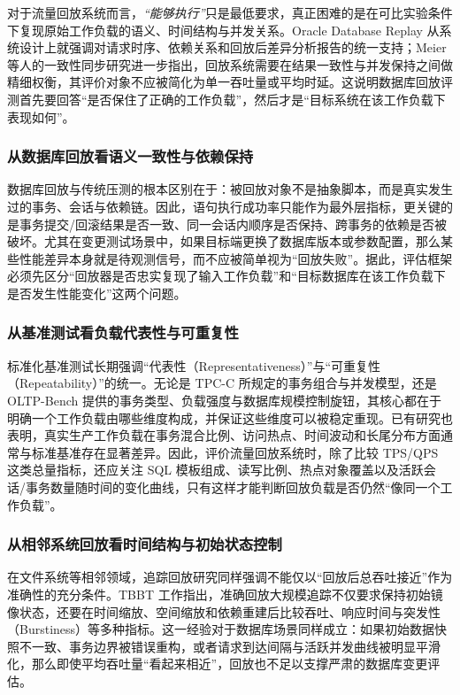 对于流量回放系统而言，\emph{“能够执行”}只是最低要求，真正困难的是在可比实验条件下复现原始工作负载的语义、时间结构与并发关系。Oracle Database Replay 从系统设计上就强调对请求时序、依赖关系和回放后差异分析报告的统一支持\cite{OracleDatabaseReplay,OracleReplayVLDB}；Meier 等人的一致性同步研究进一步指出，回放系统需要在结果一致性与并发保持之间做精细权衡，其评价对象不应被简化为单一吞吐量或平均时延\cite{ConsistentSync}。这说明数据库回放评测首先要回答“是否保住了正确的工作负载”，然后才是“目标系统在该工作负载下表现如何”。

\subsubsection{从数据库回放看语义一致性与依赖保持}

数据库回放与传统压测的根本区别在于：被回放对象不是抽象脚本，而是真实发生过的事务、会话与依赖链。因此，语句执行成功率只能作为最外层指标，更关键的是事务提交/回滚结果是否一致、同一会话内顺序是否保持、跨事务的依赖是否被破坏。尤其在变更测试场景中，如果目标端更换了数据库版本或参数配置，那么某些性能差异本身就是待观测信号，而不应被简单视为“回放失败”。据此，评估框架必须先区分“回放器是否忠实复现了输入工作负载”和“目标数据库在该工作负载下是否发生性能变化”这两个问题。

\subsubsection{从基准测试看负载代表性与可重复性}

标准化基准测试长期强调“代表性（Representativeness）”与“可重复性（Repeatability）”的统一。无论是 TPC-C 所规定的事务组合与并发模型，还是 OLTP-Bench 提供的事务类型、负载强度与数据库规模控制旋钮\cite{TPC-C,OLTPBench}，其核心都在于明确一个工作负载由哪些维度构成，并保证这些维度可以被稳定重现。已有研究也表明，真实生产工作负载在事务混合比例、访问热点、时间波动和长尾分布方面通常与标准基准存在显著差异\cite{ProductionWorkload}。因此，评价流量回放系统时，除了比较 TPS/QPS 这类总量指标，还应关注 SQL 模板组成、读写比例、热点对象覆盖以及活跃会话/事务数量随时间的变化曲线，只有这样才能判断回放负载是否仍然“像同一个工作负载”。

\subsubsection{从相邻系统回放看时间结构与初始状态控制}

在文件系统等相邻领域，追踪回放研究同样强调不能仅以“回放后总吞吐接近”作为准确性的充分条件。TBBT 工作指出，准确回放大规模追踪不仅要求保持初始镜像状态，还要在时间缩放、空间缩放和依赖重建后比较吞吐、响应时间与突发性（Burstiness）等多种指标\cite{TBBT}。这一经验对于数据库场景同样成立：如果初始数据快照不一致、事务边界被错误重构，或者请求到达间隔与活跃并发曲线被明显平滑化，那么即使平均吞吐量“看起来相近”，回放也不足以支撑严肃的数据库变更评估。

